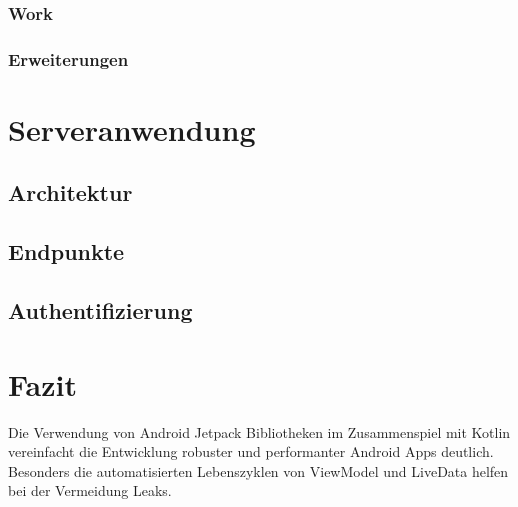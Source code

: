 \documentclass[a4paper, 11pt]{article}
\begin{document}
\subsubsection{Work}
\label{subsubsec:app:jetpack:work}

\subsubsection{Erweiterungen}
\label{subsubsec:app:jetpack:extensions}

\section{Serveranwendung}
\label{sec:backend}

\subsection{Architektur}
\label{subsec:backend:architecture}

\subsection{Endpunkte}
\label{subsec:backend:endpoints}

\subsection{Authentifizierung}
\label{subsec:backend:authentication}

\section{Fazit}
\label{sec:conclusion}
Die Verwendung von Android Jetpack Bibliotheken im Zusammenspiel mit Kotlin vereinfacht die Entwicklung robuster und performanter Android Apps deutlich.
Besonders die automatisierten Lebenszyklen von ViewModel und LiveData helfen bei der Vermeidung Leaks.
\end{document}
